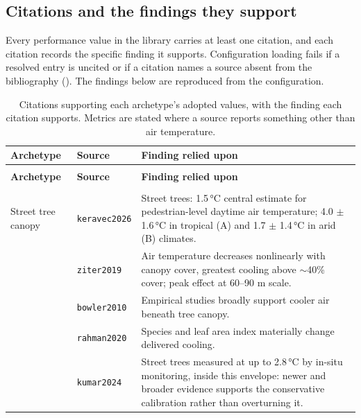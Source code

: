 \subsection{Citations and the findings they support}

Every performance value in the library carries at least one citation, and each
citation records the specific finding it supports. Configuration loading fails
if a resolved entry is uncited or if a citation names a source absent from the
bibliography (). The findings below are reproduced
from the configuration.

\begin{longtable}{@{}>{\raggedright\arraybackslash}p{30mm} l
                    >{\raggedright\arraybackslash}p{72mm}@{}}
\caption[Archetype citations and findings]{Citations supporting each
archetype's adopted values, with the finding each citation supports. Metrics
are stated where a source reports something other than air temperature.}
\label{tab:app-citations}\\
\toprule
\textbf{Archetype} & \textbf{Source} & \textbf{Finding relied upon} \\
\midrule
\endfirsthead
\multicolumn{3}{@{}l}{\small\itshape \Cref{tab:app-citations} continued}\\
\toprule
\textbf{Archetype} & \textbf{Source} & \textbf{Finding relied upon} \\
\midrule
\endhead
\midrule
\multicolumn{3}{r@{}}{\small\itshape continued on next page}\\
\endfoot
\bottomrule
\endlastfoot
Street tree canopy & \texttt{keravec2026} &
Street trees: 1.5\,\si{\degreeCelsius} central estimate for pedestrian-level daytime air temperature; 4.0 $\pm$ 1.6\,\si{\degreeCelsius} in tropical (A) and 1.7 $\pm$ 1.4\,\si{\degreeCelsius} in arid (B) climates. \\
 & \texttt{ziter2019} &
Air temperature decreases nonlinearly with canopy cover, greatest cooling above $\sim$40\% cover; peak effect at 60--90 m scale. \\
 & \texttt{bowler2010} &
Empirical studies broadly support cooler air beneath tree canopy. \\
 & \texttt{rahman2020} &
Species and leaf area index materially change delivered cooling. \\
 & \texttt{kumar2024} &
Street trees measured at up to 2.8\,\si{\degreeCelsius} by in-situ monitoring, inside this envelope: newer and broader evidence supports the conservative calibration rather than overturning it. \\

\end{longtable}
